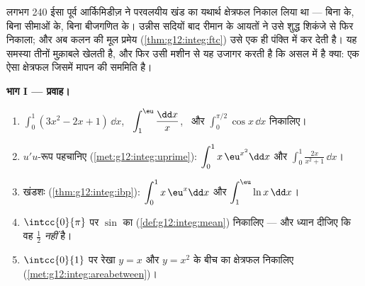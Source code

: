 \begin{problem}
\label{pb:g12:integ:1}
लगभग 240 ईसा पूर्व आर्किमिडीज़ ने परवलयीय खंड का यथार्थ क्षेत्रफल निकाल लिया
था --- बिना  के, बिना सीमाओं के, बिना बीजगणित के। उन्नीस सदियों
बाद रीमान के आयतों ने उसे शुद्ध शिकंजे से फिर निकाला; और अब कलन की मूल प्रमेय
(\cref{thm:g12:integ:ftc}) उसे एक ही पंक्ति में कर देती है। यह समस्या तीनों मुक़ाबले खेलती है,
और फिर उसी मशीन से यह उजागर करती है कि  असल में है क्या: एक ऐसा
क्षेत्रफल जिसमें मापन की सममिति है।

\medskip
\noindent\textbf{भाग I --- प्रवाह।}
\begin{enumerate}
  \item $\displaystyle\int_0^1 (3x^2 - 2x + 1)\,\dd x$, \ $\displaystyle\int_1^{\eu} \frac{\dd x}{x}$, \ और $\displaystyle\int_0^{\pi/2} \cos x\,\dd x$ निकालिए।
  \item $u'u$-रूप पहचानिए (\cref{met:g12:integ:uprime}): $\displaystyle\int_0^1 x\,\eu^{x^2}\dd x$ और $\displaystyle\int_0^1 \frac{2x}{x^2 + 1}\,\dd x$।
  \item खंडशः (\cref{thm:g12:integ:ibp}): $\displaystyle\int_0^1 x\,\eu^x \dd x$ और $\displaystyle\int_1^{\eu} \ln x\,\dd x$।
  \item $\intcc{0}{\pi}$ पर $\sin$ का  (\cref{def:g12:integ:mean}) निकालिए --- और ध्यान दीजिए कि वह
        $\frac12$ \emph{नहीं} है।
  \item $\intcc{0}{1}$ पर रेखा $y = x$ और  $y = x^2$ के बीच का क्षेत्रफल निकालिए
        (\cref{met:g12:integ:areabetween})।
\end{enumerate}


\end{problem}
